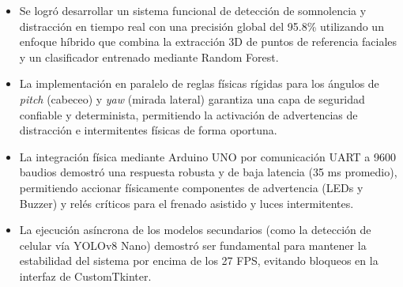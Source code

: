 \documentclass[conference]{IEEEtran}
\begin{document}
\begin{itemize}
    \item Se logró desarrollar un sistema funcional de detección de somnolencia y distracción en tiempo real con una precisión global del 95.8\% utilizando un enfoque híbrido que combina la extracción 3D de puntos de referencia faciales y un clasificador entrenado mediante Random Forest.
    \item La implementación en paralelo de reglas físicas rígidas para los ángulos de \textit{pitch} (cabeceo) y \textit{yaw} (mirada lateral) garantiza una capa de seguridad confiable y determinista, permitiendo la activación de advertencias de distracción e intermitentes físicas de forma oportuna.
    \item La integración física mediante Arduino UNO por comunicación UART a 9600 baudios demostró una respuesta robusta y de baja latencia (35 ms promedio), permitiendo accionar físicamente componentes de advertencia (LEDs y Buzzer) y relés críticos para el frenado asistido y luces intermitentes.
    \item La ejecución asíncrona de los modelos secundarios (como la detección de celular vía YOLOv8 Nano) demostró ser fundamental para mantener la estabilidad del sistema por encima de los 27 FPS, evitando bloqueos en la interfaz de CustomTkinter.
\end{itemize}

\printbibliography
\end{document}
